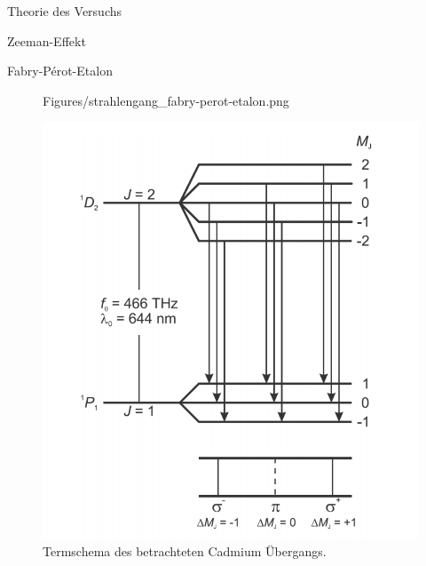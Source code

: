 \documentclass[pdftex, a4paper,11pt, twoside, ngerman]{report}
\begin{document}
\begin{chapter}{Theorie des Versuchs}
\begin{section}{Zeeman-Effekt}
\begin{subsection}{Fabry-Pérot-Etalon}
\begin{figure}[b!]
\begin{minipage}{0.48\textwidth}
            {Figures/strahlengang_fabry-perot-etalon.png}
            \caption{Strahlengang eines \textit{Fabry-Perot-Etalon}'s.}
            \label{fig:FPEstrahlengang}
          \end{minipage}\quad
          \begin{minipage}{0.48\textwidth}
            \centering
            \includegraphics[width=\textwidth]
                {Figures/termschema.png}
                \caption{Termschema des betrachteten Cadmium Übergangs.}
            \label{fig:termschema}
          \end{minipage}
        \end{figure}
      \end{subsection}
      
      
      

\end{section}
\end{chapter}
\end{document}
